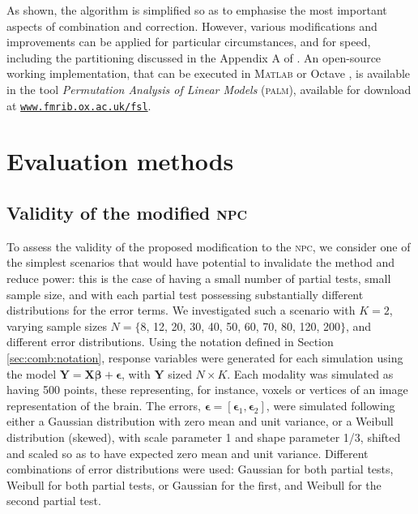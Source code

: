 As shown, the algorithm is simplified so as to emphasise the most important aspects of combination and correction. However, various modifications and improvements can be applied for particular circumstances, and for speed, including the partitioning discussed in the Appendix A of \citet{Winkler2014}. An open-source working implementation, that can be executed in \textsc{Matlab} \citep{MATLAB2015} or Octave \citep{Eaton2015}, is available in the tool \emph{Permutation Analysis of Linear Models} (\textsc{palm}), available for download at \href{http://www.fmrib.ox.ac.uk/fsl}{\texttt{www.fmrib.ox.ac.uk/fsl}}.

\section{Evaluation methods}

\subsection{Validity of the modified \textsc{npc}}

To assess the validity of the proposed modification to the \textsc{npc}, we consider one of the simplest scenarios that would have potential to invalidate the method and reduce power: this is the case of having a small number of partial tests, small sample size, and with each partial test possessing substantially different distributions for the error terms. We investigated such a scenario with $K=2$, varying sample sizes $N = \{$8, 12, 20, 30, 40, 50, 60, 70, 80, 120, 200$\}$, and different error distributions. Using the notation defined in Section \ref{sec:comb:notation}, response variables were generated for each simulation using the model $\mathbf{Y} = \mathbf{X}\boldsymbol{\beta} + \boldsymbol{\epsilon}$, with $\mathbf{Y}$ sized $N \times K$. Each modality was simulated as having 500 points, these representing, for instance, voxels or vertices of an image representation of the brain. The errors, $\boldsymbol{\epsilon} = \left[\boldsymbol{\epsilon}_1 , \boldsymbol{\epsilon}_2\right]$, were simulated following either a Gaussian distribution with zero mean and unit variance, or a Weibull distribution (skewed), with scale parameter 1 and shape parameter 1/3, shifted and scaled so as to have expected zero mean and unit variance. Different combinations of error distributions were used: Gaussian for both partial tests, Weibull for both partial tests, or Gaussian for the first, and Weibull for the second partial test.

